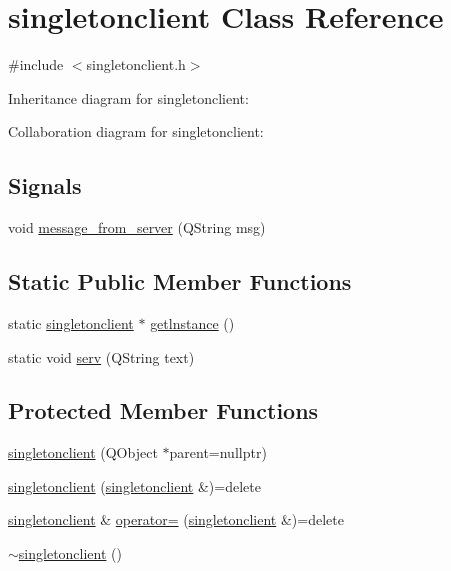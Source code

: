 \hypertarget{classsingletonclient}{}\section{singletonclient Class Reference}
\label{classsingletonclient}


{\ttfamily \#include $<$singletonclient.\+h$>$}



Inheritance diagram for singletonclient\+:


Collaboration diagram for singletonclient\+:
\subsection*{Signals}
\begin{DoxyCompactItemize}
\item 
void \mbox{\hyperlink{classsingletonclient_af8bae7e684ae3d22e2bdb8969507a85c}{message\+\_\+from\+\_\+server}} (Q\+String msg)
\end{DoxyCompactItemize}
\subsection*{Static Public Member Functions}
\begin{DoxyCompactItemize}
\item 
static \mbox{\hyperlink{classsingletonclient}{singletonclient}} $\ast$ \mbox{\hyperlink{classsingletonclient_ac300627427e118dad66ed3724902a1e2}{getlnstance}} ()
\item 
static void \mbox{\hyperlink{classsingletonclient_a86ecb62d0e64b7feadd803958e6b7343}{serv}} (Q\+String text)
\end{DoxyCompactItemize}
\subsection*{Protected Member Functions}
\begin{DoxyCompactItemize}
\item 
\mbox{\hyperlink{classsingletonclient_a799b3790931c71f18b3cc967d0295790}{singletonclient}} (Q\+Object $\ast$parent=nullptr)
\item 
\mbox{\hyperlink{classsingletonclient_ae22d833d9a9bb18aba90023bae28a680}{singletonclient}} (\mbox{\hyperlink{classsingletonclient}{singletonclient}} \&)=delete
\item 
\mbox{\hyperlink{classsingletonclient}{singletonclient}} \& \mbox{\hyperlink{classsingletonclient_af382caa9600d2bdd8b746e4198d05bf9}{operator=}} (\mbox{\hyperlink{classsingletonclient}{singletonclient}} \&)=delete
\item 
\mbox{\hyperlink{classsingletonclient_a34a2399f1dd0f29c78baaa74b78d570c}{$\sim$singletonclient}} ()
\end{DoxyCompactItemize}
